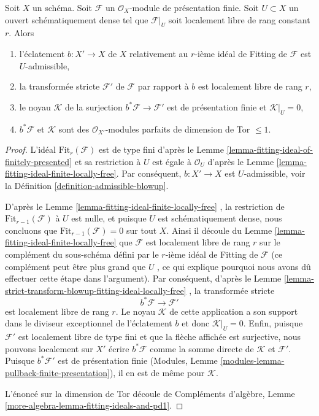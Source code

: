 \begin{lemma}
\label{lemma-blowup-fitting-ideal}
Soit  $X$  un schéma. Soit  $\mathcal{F}$  un  $\mathcal{O}_X$-module de
présentation finie. Soit  $U \subset X$  un ouvert schématiquement dense tel que
 $\mathcal{F}|_U$  soit localement libre de rang constant  $r$. Alors
\begin{enumerate}
\item l'éclatement  $b : X' \to X$  de  $X$  relativement au  $r$-ième idéal de
Fitting de  $\mathcal{F}$  est  $U$-admissible,
\item la transformée stricte  $\mathcal{F}'$  de  $\mathcal{F}$  par rapport à  $b$  est
localement libre de rang  $r$,
\item le noyau  $\mathcal{K}$  de la surjection  $b^*\mathcal{F} \to \mathcal{F}'$  est de présentation finie et
 $\mathcal{K}|_U = 0$,
\item $b^*\mathcal{F}$  et  $\mathcal{K}$  sont des  $\mathcal{O}_{X'}$-modules parfaits de dimension
de Tor  $\leq 1$.
\end{enumerate}
\end{lemma}

\begin{proof}
L'idéal  $\text{Fit}_r(\mathcal{F})$  est de type fini d'après le Lemme  \ref{lemma-fitting-ideal-of-finitely-presented}  et sa
restriction à  $U$  est égale à  $\mathcal{O}_U$  d'après le Lemme  \ref{lemma-fitting-ideal-finite-locally-free}.
Par conséquent,  $b : X' \to X$  est  $U$-admissible, voir la Définition
 \ref{definition-admissible-blowup}.

\medskip\noindent
D'après le Lemme  \ref{lemma-fitting-ideal-finite-locally-free} , la restriction de  $\text{Fit}_{r - 1}(\mathcal{F})$  à  $U$  est
nulle, et puisque  $U$  est schématiquement dense, nous concluons que
 $\text{Fit}_{r - 1}(\mathcal{F}) = 0$  sur tout  $X$. Ainsi il découle du Lemme  \ref{lemma-fitting-ideal-finite-locally-free}  que
 $\mathcal{F}$  est localement libre de rang  $r$  sur le complément du
sous-schéma défini par le  $r$-ième idéal de Fitting de  $\mathcal{F}$  (ce
complément peut être plus grand que  $U$ , ce qui explique pourquoi nous
avons dû effectuer cette étape dans l'argument). Par conséquent, d'après le Lemme
 \ref{lemma-strict-transform-blowup-fitting-ideal-locally-free} , la transformée stricte
$$
b^*\mathcal{F} \longrightarrow \mathcal{F}'
$$
est localement libre de rang  $r$. Le noyau  $\mathcal{K}$  de cette
application a son support dans le diviseur exceptionnel de l'éclatement  $b$ 
et donc  $\mathcal{K}|_U = 0$. Enfin, puisque  $\mathcal{F}'$  est localement libre de type
fini et que la flèche affichée est surjective, nous pouvons localement sur
 $X'$  écrire  $b^*\mathcal{F}$  comme la somme directe de  $\mathcal{K}$  et
 $\mathcal{F}'$. Puisque  $b^*\mathcal{F}'$  est de présentation finie (Modules, Lemme
 \ref{modules-lemma-pullback-finite-presentation}), il en est de même pour  $\mathcal{K}$.

\medskip\noindent
L'énoncé sur la dimension de Tor découle de Compléments d'algèbre, Lemme  \ref{more-algebra-lemma-fitting-ideals-and-pd1}.
\end{proof}





